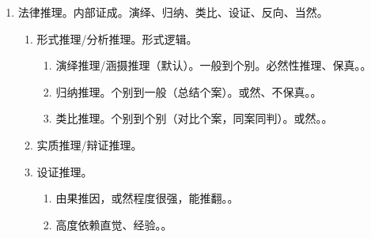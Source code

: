 \begin{enumerate}
\begin{enumerate}
\begin{enumerate}
\begin{enumerate}
\begin{itemize}
                                  \item 内部证成越细致，结论的说服力越强，但不影响结论成立。。
                                \end{itemize}
                          \item 外部证成。。法律解释 + 漏洞填补。
                                \begin{itemize}
                                  \item 大小前提、结论内在逻辑正确，外部前提错误 \yjt 结论错误 \yjt 关心前提。
                                  \item 外部证成必然包含内部证成 \yjt 搞定前提得符合逻辑。
                                  \item 形式上表现为三段论，核心是法律解释和法律渊源选择。
                                \end{itemize}
                        \end{enumerate}
                \end{enumerate}
          \item 法律推理。内部证成。演绎、归纳、类比、设证、反向、当然。
                \begin{enumerate}
                  \item 形式推理/分析推理。形式逻辑。
                        \begin{enumerate}
                          \item 演绎推理/涵摄推理（默认）。一般到个别。必然性推理、保真。。
                          \item 归纳推理。个别到一般（总结个案）。或然、不保真。。
                          \item 类比推理。个别到个别（对比个案，同案同判）。或然。。
                        \end{enumerate}
                  \item 实质推理/辩证推理。
                  \item 设证推理。
                        \begin{enumerate}
                          \item 由果推因，或然程度很强，能推翻。。
                          \item 高度依赖直觉、经验。。
                        \end{enumerate}

\end{enumerate}
\end{enumerate}
\end{enumerate}
